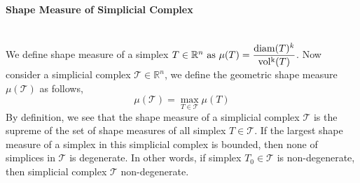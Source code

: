     \paragraph{Shape Measure of Simplicial Complex}\mbox{}\\
    We define shape measure of a simplex \(T \in\mathbb{R}^n$ as $\mu({{T}}) = \displaystyle \frac{\operatorname{diam}({T})^k}{\operatorname{vol^k}({T})}\). Now consider a simplicial complex $\mathcal{T}\in\mathbb{R}^n$, we define the geometric shape measure $\mu(\mathcal{T})$ as follows,
    \begin{equation*}
    \mu(\mathcal{T}) = \max_{T \in \mathcal{T}} \mu(T)
    \end{equation*}
    By definition, we see that the shape measure of a simplicial complex $\mathcal{T}$ is the supreme of the set of shape measures of all simplex $T\in\mathcal{T}$. If the largest shape measure of a simplex in this simplicial complex is bounded, then none of simplices in $\mathcal{T}$ is degenerate. In other words, if simplex $T_0 \in\mathcal{T}$ is non-degenerate, then simplicial complex $\mathcal{T}$ non-degenerate.
